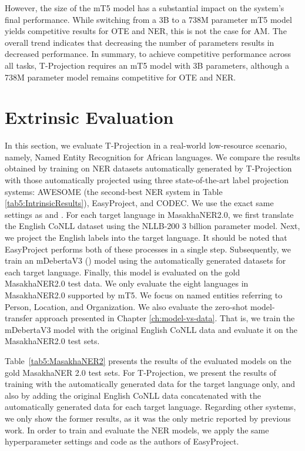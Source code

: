However, the size of the mT5 model has a substantial impact on the system's final performance. While switching from a 3B to a 738M parameter mT5 model yields competitive results for OTE and NER, this is not the case for AM. The overall trend indicates that decreasing the number of parameters results in decreased performance. In summary, to achieve competitive performance across all tasks, T-Projection requires an mT5 model with 3B parameters, although a 738M parameter model remains competitive for OTE and NER.

\section{Extrinsic Evaluation}



In this section, we evaluate T-Projection in a real-world low-resource scenario, namely, Named Entity Recognition for African languages. We compare the results obtained by training on NER datasets automatically generated by T-Projection with those automatically projected using three state-of-the-art label projection systems: AWESOME (the second-best NER system in Table \ref{tab5:IntrinsicResults}), EasyProject, and CODEC. We use the exact same settings as \citet{chen-etal-2023-frustratingly} and \cite{DBLP:journals/corr/abs-2402-03131}. For each target language in MasakhaNER2.0, we first translate the English CoNLL dataset using the NLLB-200 3 billion parameter model. Next, we project the English labels into the target language. It should be noted that EasyProject performs both of these processes in a single step. Subsequently, we train an mDebertaV3 (\cite{DBLP:conf/iclr/HeLGC21/deberta}) model using the automatically generated datasets for each target language. Finally, this model is evaluated on the gold MasakhaNER2.0 test data. We only evaluate the eight languages in MasakhaNER2.0 supported by mT5. We focus on named entities referring to Person, Location, and Organization. We also evaluate the zero-shot model-transfer approach presented in Chapter \ref{ch:model-vs-data}. That is, we train the mDebertaV3 model with the original English CoNLL data and evaluate it on the MasakhaNER2.0 test sets.


Table~\ref{tab5:MasakhaNER2} presents the results of the evaluated models on the gold MasakhaNER 2.0 test sets. For T-Projection, we present the results of training with the automatically generated data for the target language only, and also by adding the original English CoNLL data concatenated with the automatically generated data for each target language. Regarding other systems, we only show the former results, as it was the only metric reported by previous work. In order to train and evaluate the NER models, we apply the same hyperparameter settings and code as the authors of EasyProject.

